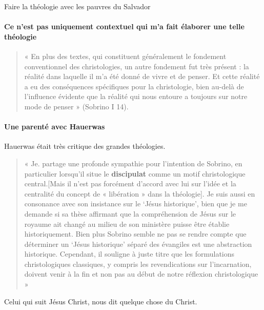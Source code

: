 \begin{Ex}
Faire la théologie avec les pauvres du Salvador
\end{Ex}

\paragraph{Ce n'est pas uniquement contextuel qui m'a fait élaborer une telle théologie}

\begin{quote}
    « En plus des textes, qui constituent généralement le fondement conventionnel des christologies, un
autre fondement fut très présent : la réalité dans laquelle il m’a été donné de vivre et de penser. Et
cette réalité a eu des conséquences spécifiques pour la christologie, bien au-delà de l’influence
évidente que la réalité qui nous entoure a toujours sur notre mode de penser » (Sobrino I 14).
\end{quote}


\paragraph{Une parenté avec Hauerwas}
Hauerwas était très critique des grandes théologies.
\begin{quote}
    « Je. partage une profonde sympathie pour l’intention de Sobrino, en particulier lorsqu’il situe le
\textbf{discipulat} comme un motif christologique central.[Mais il n’est pas forcément d’accord avec lui sur
l’idée et la centralité du concept de « libération » dans la théologie]. Je suis aussi en consonance avec
son insistance sur le ‘Jésus historique’, bien que je me demande si sa thèse affirmant que la
compréhension de Jésus sur le royaume ait changé au milieu de son ministère puisse être établie
historiquement. Bien plus Sobrino semble ne pas se rendre compte que déterminer un ‘Jésus
historique’ séparé des évangiles est une abstraction historique. Cependant, il souligne à juste titre que
les formulations christologiques classiques, y compris les revendications sur l’incarnation, doivent
venir à la fin et non pas au début de notre réflexion christologique » 
\end{quote}

Celui qui suit Jésus Christ, nous dit quelque chose du Christ.

